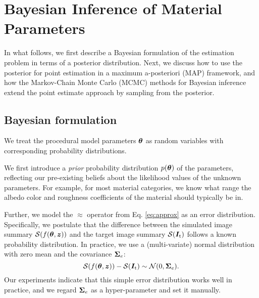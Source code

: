 \section{Bayesian Inference of Material Parameters}
\label{sec:bayesian:param}

In what follows, we first describe a Bayesian formulation of the estimation problem in terms of a posterior distribution. Next, we discuss how to use the posterior for point estimation in a maximum a-posteriori (MAP) framework, and how the Markov-Chain Monte Carlo (MCMC) methods for Bayesian inference extend the point estimate approach by sampling from the posterior.


\subsection{Bayesian formulation}
\label{ssec:point_sec}

We treat the procedural model parameters $\bm\theta$ as random variables with corresponding probability distributions.

We first introduce a \emph{prior} probability distribution $p(\bm\theta)$ of the parameters, reflecting our pre-existing beliefs about the likelihood values of the unknown parameters. For example, for most material categories, we know what range the albedo color and roughness coefficients of the material should typically be in.

Further, we model the $\approx$ operator from Eq. \eqref{eq:approx} as an error distribution. Specifically, we postulate that the difference between the simulated image summary $\mathcal{S}(f(\bm\theta, \bm{z}))$ and the target image summary $\mathcal{S}(\bm{I}_\mathrm{t})$ follows a known probability distribution.
In practice, we use a (multi-variate) normal distribution with zero mean and the covariance $\bm\Sigma_e$:
\begin{equation}
	\mathcal{S}(f(\bm\theta, \bm{z})) - \mathcal{S}(\bm{I}_\mathrm{t}) \sim \mathcal{N}(0, \bm\Sigma_e).
\end{equation}
Our experiments indicate that this simple error distribution works well in practice, and we regard $\bm\Sigma_e$ as a hyper-parameter and set it manually.

